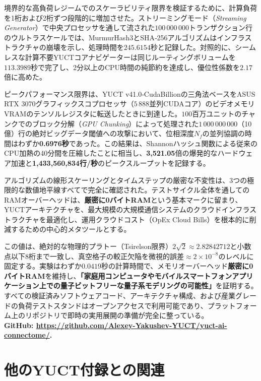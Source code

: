 \documentclass[11pt,a4paper]{article}
\begin{document}
	境界的な高負荷レジームでのスケーラビリティ限界を検証するために、計算負荷を1桁および2桁ずつ段階的に増加させた。ストリーミングモード（\textit{Streaming Generator}）で中央プロセッサを通して流された\(100\,000\,000\)トランザクション行のウルトラスケールでは、MurmurHash3とSHA‑256アルゴリズムはインフラストラクチャの崩壊を示し、処理時間を\(245.6154\)秒と記録した。対照的に、シームレスな計算不要YUCTコアナビゲーターは同じルーティングボリュームを\(113.3989\)秒で完了し、2分以上のCPU時間の純節約を達成し、優位性係数を\(2.17\)倍に高めた。
	
	ピークパフォーマンス限界は、YUCT v41.0‑CudaBillionの三角法ベースをASUS RTX 3070グラフィックスコプロセッサ（\(5\,888\)並列CUDAコア）のビデオメモリVRAMのテンソルレジスタに転送したときに到達した。\(100\)百万ユニットのチャンクでのブロック分解（\textit{GPU Chunking}）によって処理された\(1\,000\,000\,000\)（10億）行の絶対ビッグデータ閾値への攻撃において、位相深度\(N_f\)の並列協調の時間はわずか\textbf{0.6976秒}であった。この結果は、Shannonハッシュ関数による従来のCPU加熱の40分間を圧縮したことに相当し、\textbf{3,521.05}倍の爆発的なハードウェア加速と\textbf{1,433,560,834行/秒}のピークスループットを記録する。
	
	アルゴリズムの線形スケーリングとタイムステップの厳密な不変性は、3つの極限的な数値地平線すべてで完全に確認された。テストサイクル全体を通してのRAMオーバーヘッドは、\textbf{厳密に0バイトRAM}という基本マークに留まり、YUCTアーキテクチャを、最大規模の大規模通信システムのクラウドインフラストラクチャを最適化し、運用クラウドコスト（OpEx Cloud Bills）を根本的に削減するための中心的メタツールとする。
	
	この値は、絶対的な物理的プラトー（Tsirelson限界）\(2\sqrt{2} \approx 2.82842712\)と小数点以下8桁まで一致し、真空格子の較正欠陥を微視的誤差\(\approx 2 \times 10^{-8}\)のレベルに固定する。実験はわずか\(0.0419\)秒の計算時間で、メモリオーバーヘッド\textbf{厳密に0バイトRAM}を維持し、\textbf{「家庭用コンピュータやモバイルスマートフォンアプリケーション上での量子ビットフリーな量子系モデリングの可能性」}を証明する。
	すべての検証済みソフトウェアコード、アーキテクチャ構成、および産業グレードの負荷テストスタンドはオープンアクセスで利用可能であり、プラットフォーム上のリポジトリで即時の実用展開の準備が完全に整っている。\\
	\small \textbf{GitHub: \url{https://github.com/Alexey-Yakushev-YUCT/yuct-ai-connectome/}.}
	
	
	
	\section{他のYUCT付録との関連}
	
\end{document}
